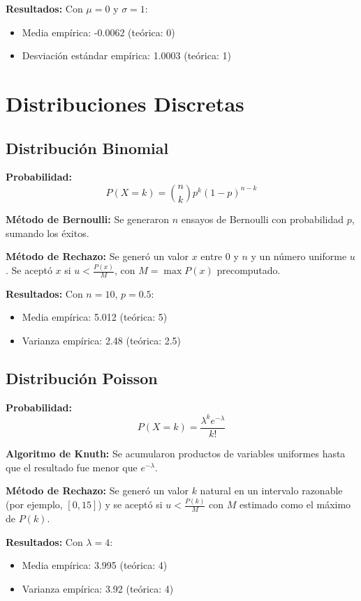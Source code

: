 \documentclass{article}
\begin{document}
\textbf{Resultados:} Con $\mu=0$ y $\sigma=1$:
\begin{itemize}
\item Media empírica: -0.0062 (teórica: 0)
\item Desviación estándar empírica: 1.0003 (teórica: 1)
\end{itemize}

\section{Distribuciones Discretas}

\subsection{Distribución Binomial}
\textbf{Probabilidad:}
\begin{equation}
P(X = k) = \binom{n}{k} p^k (1-p)^{n-k}
\end{equation}

\textbf{Método de Bernoulli:} Se generaron $n$ ensayos de Bernoulli con probabilidad $p$, sumando los éxitos.

\textbf{Método de Rechazo:} Se generó un valor $x$ entre $0$ y $n$ y un número uniforme $u$. Se aceptó $x$ si $u < \frac{P(x)}{M}$, con $M = \max P(x)$ precomputado.

\textbf{Resultados:} Con $n=10$, $p=0.5$:
\begin{itemize}
\item Media empírica: 5.012 (teórica: 5)
\item Varianza empírica: 2.48 (teórica: 2.5)
\end{itemize}

\subsection{Distribución Poisson}
\textbf{Probabilidad:}
\begin{equation}
P(X = k) = \frac{\lambda^k e^{-\lambda}}{k!}
\end{equation}

\textbf{Algoritmo de Knuth:} Se acumularon productos de variables uniformes hasta que el resultado fue menor que $e^{-\lambda}$.

\textbf{Método de Rechazo:} Se generó un valor $k$ natural en un intervalo razonable (por ejemplo, $[0,15]$) y se aceptó si $u < \frac{P(k)}{M}$ con $M$ estimado como el máximo de $P(k)$.

\textbf{Resultados:} Con $\lambda=4$:
\begin{itemize}
\item Media empírica: 3.995 (teórica: 4)
\item Varianza empírica: 3.92 (teórica: 4)
\end{itemize}
\end{document}
